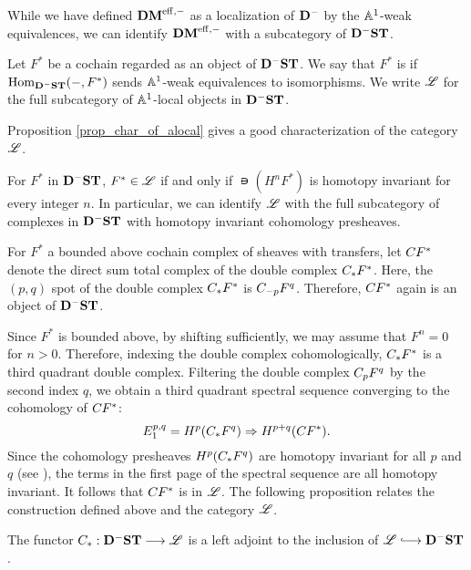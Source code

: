 While we have defined $\DMeff$ as a localization of 
$\DCat^-$ by the $\A^1$-weak equivalences, we can identify
$\DMeff$ with a subcategory of $\DShCor$.

\begin{defn}\label{def_ALocal}
Let $F^*$ be a cochain regarded as an object of $\DShCor$. We say that $F^*$ is 
 if $\hom_{\DShCor}(-, F^*)$ sends $\A^1$-weak 
equivalences to isomorphisms. We write $\ALocal$ for the full 
subcategory of $\A^1$-local objects in $\DShCor$.
\end{defn}

Proposition \ref{prop_char_of_alocal} gives a good 
characterization of the category $\ALocal$.

\begin{prop}\label{prop_char_of_alocal}
For $F^*$ in $\DShCor$, $F^* \in \ALocal$ if and only if $\nis(H^n
F^*)$ is homotopy invariant for every integer $n$. In particular, we
can identify $\ALocal$ with the full subcategory of complexes in
$\DShCor$ with homotopy invariant cohomology presheaves.
\end{prop}

\begin{defn}
For $F^*$ a bounded above cochain complex of sheaves with transfers,
let $\suslC[] F^*$ denote the direct sum total complex of the double complex
$\suslC[*] F^*$. Here, the $(p,q)$ spot of the double complex
$\suslC[*] F^*$ is $\suslC[-p] F^q$. Therefore, $\suslC[]F^*$ again is
an object of $\DShCor$.
\end{defn}

Since $F^*$ is bounded above, by
shifting sufficiently, we may assume that $F^n = 0$ for $n > 0$. 
Therefore, indexing the double complex
cohomologically, $\suslC F^*$ is a third quadrant double
complex. Filtering the double complex $\suslC[p] F^q$ by the second index
$q$, we obtain a third quadrant spectral sequence converging to the
cohomology of $\suslC[] F^*$:
\[
E^{p,q}_1 = H^p(\suslC F^q) \Rightarrow H^{p + q}(\suslC[] F^*).
\]
Since the cohomology presheaves $H^p(\suslC F^q)$ are homotopy 
invariant for all $p$ and $q$ (see \cite[2.19]{MVW}), the terms in 
the first page of the spectral sequence are all homotopy 
invariant. It follows that $\suslC[] F^*$ is in $\ALocal$.
The following proposition relates the construction defined above
and the category $\ALocal$.

\begin{prop}\label{prop_suslC_ALocal}
The functor $\suslC : \DShCor \to \ALocal$ is a left adjoint to
the inclusion of $\ALocal \into \DShCor$.
\end{prop}

